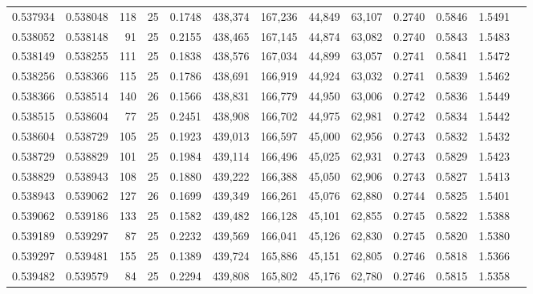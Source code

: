 \begin{tabular}{rrrrrrrrrrrrr}
0.537934 & 0.538048 &   118 &  25 &                                     0.1748 & 438,374 & 167,236 &  44,849 &  63,107 & 0.2740 & 0.5846 & 1.5491 \\
0.538052 & 0.538148 &    91 &  25 &                                     0.2155 & 438,465 & 167,145 &  44,874 &  63,082 & 0.2740 & 0.5843 & 1.5483 \\
0.538149 & 0.538255 &   111 &  25 &                                     0.1838 & 438,576 & 167,034 &  44,899 &  63,057 & 0.2741 & 0.5841 & 1.5472 \\
0.538256 & 0.538366 &   115 &  25 &                                     0.1786 & 438,691 & 166,919 &  44,924 &  63,032 & 0.2741 & 0.5839 & 1.5462 \\
0.538366 & 0.538514 &   140 &  26 &                                     0.1566 & 438,831 & 166,779 &  44,950 &  63,006 & 0.2742 & 0.5836 & 1.5449 \\
0.538515 & 0.538604 &    77 &  25 &                                     0.2451 & 438,908 & 166,702 &  44,975 &  62,981 & 0.2742 & 0.5834 & 1.5442 \\
0.538604 & 0.538729 &   105 &  25 &                                     0.1923 & 439,013 & 166,597 &  45,000 &  62,956 & 0.2743 & 0.5832 & 1.5432 \\
0.538729 & 0.538829 &   101 &  25 &                                     0.1984 & 439,114 & 166,496 &  45,025 &  62,931 & 0.2743 & 0.5829 & 1.5423 \\
0.538829 & 0.538943 &   108 &  25 &                                     0.1880 & 439,222 & 166,388 &  45,050 &  62,906 & 0.2743 & 0.5827 & 1.5413 \\
0.538943 & 0.539062 &   127 &  26 &                                     0.1699 & 439,349 & 166,261 &  45,076 &  62,880 & 0.2744 & 0.5825 & 1.5401 \\
0.539062 & 0.539186 &   133 &  25 &                                     0.1582 & 439,482 & 166,128 &  45,101 &  62,855 & 0.2745 & 0.5822 & 1.5388 \\
0.539189 & 0.539297 &    87 &  25 &                                     0.2232 & 439,569 & 166,041 &  45,126 &  62,830 & 0.2745 & 0.5820 & 1.5380 \\
0.539297 & 0.539481 &   155 &  25 &                                     0.1389 & 439,724 & 165,886 &  45,151 &  62,805 & 0.2746 & 0.5818 & 1.5366 \\
0.539482 & 0.539579 &    84 &  25 &                                     0.2294 & 439,808 & 165,802 &  45,176 &  62,780 & 0.2746 & 0.5815 & 1.5358 \\

\end{tabular}
